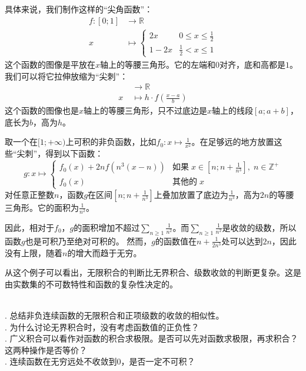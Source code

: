 \documentclass[12pt,UTF8]{ctexbook}
\begin{document}
具体来说，我们制作这样的“尖角函数”：
\begin{align*}
    f: [0;1] &\rightarrow \mathbb{R} \\
x \;&\mapsto \begin{cases}
    2x & 0\leqslant x \leqslant \frac{1}{2} \\
    1 - 2x & \frac{1}{2} < x \leqslant 1
\end{cases} 
\end{align*}
这个函数的图像是平放在$x$轴上的等腰三角形。它的左端和$0$对齐，底和高都是$1$。我们可以将它拉伸放缩为“尖刺”：
\begin{align*}
   [a;a+b] &\rightarrow \mathbb{R} \\
    x \;&\mapsto h\cdot f\left(\frac{x-a}{b}\right)
\end{align*}
这个函数的图像也是$x$轴上的等腰三角形，只不过底边是$x$轴上的线段$[a;a+b]$，底长为$b$，高为$h$。

取一个在$[1;+\infty)$上可积的非负函数，比如$\displaystyle f_0: x\mapsto \frac{1}{x^2}$。在足够远的地方放置这些“尖刺”，得到以下函数：
$$
g: x\mapsto \begin{cases}
    \displaystyle f_0(x) + 2n f\left(n^3(x - n)\right) & \mbox{如果}\; x \in \left[n;n+\frac{1}{n^3}\right],\; n\in\mathbb{Z}^+ \\
    f_0(x) & \mbox{其他的}\;x
\end{cases}
$$
对任意正整数$n$，函数$g$在区间$\left[n;n+\frac{1}{n^3}\right]$上叠加放置了底边为$\frac{1}{n^3}$，高为$2n$的等腰三角形。它的面积为$\frac{1}{n^2}$。

因此，相对于$f_0$，$g$的面积增加不超过$\displaystyle \sum_{n\geqslant 1} \frac{1}{n^2}$。而$\displaystyle \sum_{n\geqslant 1} \frac{1}{n^2}$是收敛的级数，所以函数$g$也是可积乃至绝对可积的。
然而，$g$的函数值在$n+\frac{1}{2n^3}$处可以达到$2n$，因此没有上限，随着$n$的增大而趋于无穷。

从这个例子可以看出，无限积合的判断比无界积合、级数收敛的判断更复杂。这是由实数集的不可数特性和函数的复杂性决定的。

\begin{sk}
    \mbox{} \\
    . 总结非负连续函数的无限积合和正项级数的收敛的相似性。\\
    . 为什么讨论无界积合时，没有考虑函数值的正负性？\\
    . 广义积合可以看作对函数的积合求极限。是否可以先对函数求极限，再求积合？这两种操作是否等价？\\
    . 连续函数在无穷远处不收敛到$0$，是否一定不可积？
\end{sk}
\end{document}
